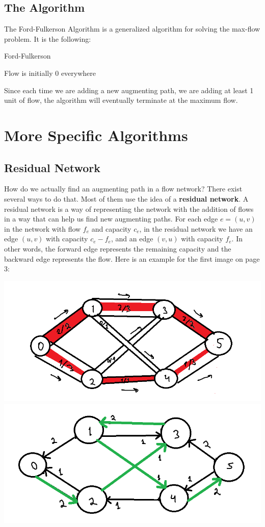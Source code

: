 \documentclass[12pt, letterpaper]{article}
\begin{document}
\subsection{The Algorithm}
The Ford-Fulkerson Algorithm is a generalized algorithm for solving the max-flow problem. It is the following:

\begin{algorithm}
\caption{Ford-Fulkerson}
Flow is initially 0 everywhere\;
\end{algorithm}
Since each time we are adding a new augmenting path, we are adding at least 1 unit of flow, the algorithm will eventually terminate at the maximum flow.

\section{More Specific Algorithms}

\subsection{Residual Network}
How do we actually find an augmenting path in a flow network? There exist several ways to do that. Most of them use the idea of a \textbf{residual network}. A residual network is a way of representing the network with the addition of flows in a way that can help us find new augmenting paths. For each edge $e=(u, v)$ in the network with flow $f_e$ and capacity $c_e$, in the residual network we have an edge $(u, v)$ with capacity $c_e-f_e$, and an edge $(v, u)$ with capacity $f_e$. In other words, the forward edge represents the remaining capacity and the backward edge represents the flow. Here is an example for the first image on page 3:

\includegraphics[scale=0.35]{figure3.png}
\includegraphics[scale=0.35]{figure5.png}
\end{document}
